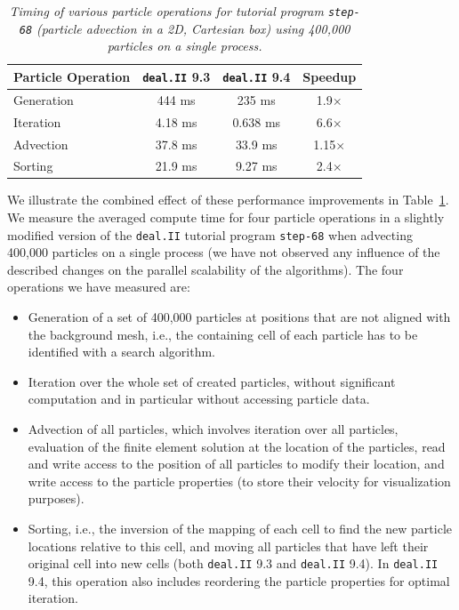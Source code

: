 \documentclass{ansarticle-preprint}
\newcommand{\specialword}[1]{\texttt{#1}}
\newcommand{\dealii}{{\specialword{deal.II}}\xspace}
\begin{document}
\begin{table}
  \caption{\it Timing of various particle operations for tutorial program \texttt{step-68} (particle advection in a 2D, Cartesian box) using 400,000 particles on a single process.}
  \label{tab:particle_timing}
  \centering
  \begin{tabular}{lccc}
    \toprule
    Particle Operation & \dealii 9.3 & \dealii 9.4 & Speedup      \\ \midrule
    Generation         & 444 ms      & 235 ms      & 1.9$\times$  \\
    Iteration          & 4.18 ms     & 0.638 ms    & 6.6$\times$  \\
    Advection          & 37.8 ms     & 33.9 ms     & 1.15$\times$ \\
    Sorting            & 21.9 ms     & 9.27 ms     & 2.4$\times$  \\
    \bottomrule
  \end{tabular}
  \end{table}

We illustrate the combined effect of these performance improvements in Table~\ref{tab:particle_timing}. We measure the averaged compute time for four particle operations in a slightly modified version of the \dealii tutorial program \texttt{step-68} when advecting 400,000 particles on a single process (we have not observed any influence of the described changes on the parallel scalability of the algorithms).
The four operations we have measured are:
\begin{itemize}
\item Generation of a set of 400,000 particles at positions that are not aligned with the background mesh, i.e., the containing cell of each particle has to be identified with a search algorithm.
\item Iteration over the whole set of created particles, without
  significant computation and in particular without accessing particle data.
\item Advection of all particles, which involves iteration over all particles, evaluation of the finite element solution at the location of the particles, read and write access to the position of all particles to modify their location, and write access to the particle properties (to store their velocity for visualization purposes).
\item Sorting, i.e., the inversion of the mapping of each cell to find the new particle locations relative to this cell, and moving all particles that have left their original cell into new cells (both \dealii 9.3 and \dealii 9.4). In \dealii 9.4, this operation also includes reordering the particle properties for optimal iteration.
\end{itemize}
\end{document}
